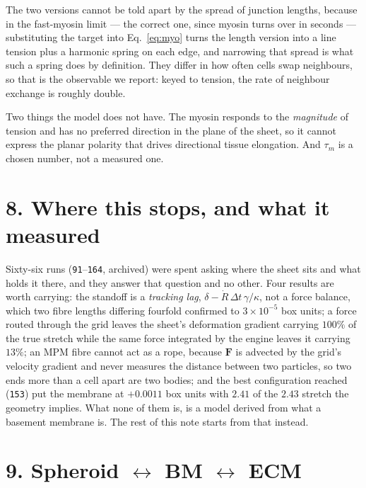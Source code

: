 \documentclass[10pt,a4paper]{article}
\newcommand{\op}[1]{\texttt{#1}}
\begin{document}
The two versions cannot be told apart by the spread of junction lengths, because in the fast-myosin
limit --- the correct one, since myosin turns over in seconds --- substituting the target into
Eq.~\eqref{eq:myo} turns the length version into a line tension plus a harmonic spring on each edge, and
narrowing that spread is what such a spring does by definition. They differ in how often cells swap
neighbours, so that is the observable we report: keyed to tension, the rate of neighbour exchange is
roughly double.

Two things the model does not have. The myosin responds to the \emph{magnitude} of tension and has no
preferred direction in the plane of the sheet, so it cannot express the planar polarity that drives
directional tissue elongation. And $\tau_m$ is a chosen number, not a measured one.

\section*{8.\; Where this stops, and what it measured}

Sixty-six runs (\op{91}--\op{164}, archived) were spent asking where the sheet sits and what holds it
there, and they answer that question and no other. Four results are worth carrying: the standoff is a
\emph{tracking lag}, $\delta-\dot R\,\Delta t\,\gamma/\kappa$, not a force balance, which two fibre
lengths differing fourfold confirmed to $3\times10^{-5}$ box units; a force routed through the grid
leaves the sheet's deformation gradient carrying $100\%$ of the true stretch while the same force
integrated by the engine leaves it carrying $13\%$; an MPM fibre cannot act as a rope, because
$\mathbf F$ is advected by the grid's velocity gradient and never measures the distance between two
particles, so two ends more than a cell apart are two bodies; and the best configuration reached
(\op{153}) put the membrane at $+0.0011$ box units with $2.41$ of the $2.43$ stretch the geometry
implies. What none of them is, is a model derived from what a basement membrane is. The rest of this
note starts from that instead.

\section*{9.\; Spheroid $\leftrightarrow$ BM $\leftrightarrow$ ECM}
\end{document}
